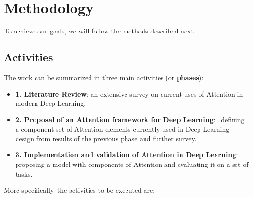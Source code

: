 \documentclass[12pt]{article}
\begin{document}
\let\clearpage\relax

\section{Methodology}

To achieve our goals, we will follow the methods described next.

\subsection{Activities}
\label{sec:activities}
The work can be summarized in three main activities (or \textbf{phases}):
\begin{itemize}
    \item \textbf{1. Literature Review}: an extensive survey on current uses of Attention in modern
        Deep Learning.
    \item \textbf{2. Proposal of an Attention framework for Deep Learning}: \
        defining a component set of Attention elements currently used in Deep Learning design from results of the previous phase and further survey.
    \item \textbf{3. Implementation and validation of Attention in Deep Learning}:
        proposing a model with components of Attention and evaluating it on a set of tasks.
\end{itemize}

More specifically, the activities to be executed are:
\end{document}
